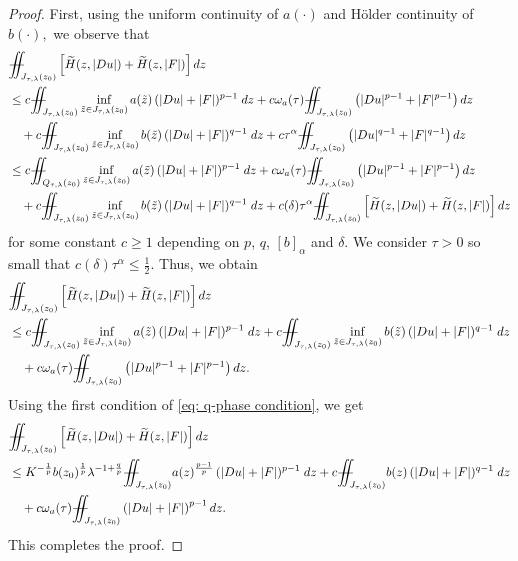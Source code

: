 \documentclass[11pt,oneside, english,reqno,twoside a4paper]{amsart}
\theoremstyle{definition}
\numberwithin{theorem}{section}
\numberwithin{equation}{section}
\newcommand{\iintss}{{\int\hspace{-0.28cm}\int}}
\newcommand{ \miints }{{\iintss\hspace{-0.56cm} -\hspace{-0.15cm}-}}
\newcommand{\miint}[1]{{\miints_{\hspace{-0.13cm}#1}}}
\begin{document}
\begin{proof}
First, using the uniform continuity of $a(\cdot)$ and H\"{o}lder continuity of $b(\cdot),$ we observe that
\begin{align*}
&\miint{J_{\tau,\lambda}(z_0)} \left[ \widetilde{H}(z,|Du|)+\widetilde{H}(z,|F|)\right] dz\\
&\leq c\miint{J_{\tau,\lambda}(z_0)} \inf_{\tilde{z}\in J_{\tau,\lambda}(z_0)}a(\tilde{z}) \, (|Du|+|F|)^{p-1} \; dz+c \omega_a(\tau) \miint{J_{\tau,\lambda}(z_0)} \left(|Du|^{p-1}+|F|^{p-1}\right) dz\\
&\quad +c\miint{J_{\tau,\lambda}(z_0)}\inf_{\tilde{z}\in J_{\tau,\lambda}(z_0)}b(\tilde{z}) \, (|Du|+|F|)^{q-1}\;dz+c\tau^\alpha \miint{J_{\tau,\lambda}(z_0)} \left(|Du|^{q-1}+|F|^{q-1}\right) dz\\
& \leq c\miint{Q_{\tau,\lambda}(z_0)} \inf_{\tilde{z}\in J_{\tau,\lambda}(z_0)}a(\tilde{z}) \, (|Du|+|F|)^{p-1} \; dz+c \omega_a(\tau) \miint{J_{\tau,\lambda}(z_0)} \left(|Du|^{p-1}+|F|^{p-1}\right) dz\\
&\quad +c\miint{J_{\tau,\lambda}(z_0)}\inf_{\tilde{z}\in J_{\tau,\lambda}(z_0)}b(\tilde{z}) \, (|Du|+|F|)^{q-1}\;dz+c(\delta) \tau^\alpha \miint{J_{\tau,\lambda}(z_0)} \left[\widetilde{H}(z,|Du|)+\widetilde{H}(z,|F|) \right] dz
\end{align*}
for some constant $c \geq 1$ depending on $p$, $q$, $[b]_\alpha$ and $\delta$.
We consider $\tau>0$ so small that $\displaystyle c (\delta) \tau^\alpha \leq \frac{1}{2}$. Thus, we obtain
\begin{align*}
&\miint{J_{\tau,\lambda}(z_0)} \left[\widetilde{H}(z,|Du|)+\widetilde{H}(z,|F|) \right]dz\\
& \leq c\miint{J_{\tau,\lambda}(z_0)} \inf_{\tilde{z}\in J_{\tau,\lambda}(z_0)}a(\tilde{z}) \, (|Du|+|F|)^{p-1} \; dz+c\miint{J_{\tau,\lambda}(z_0)}\inf_{\tilde{z}\in J_{\tau,\lambda}(z_0)}b(\tilde{z}) \, (|Du|+|F|)^{q-1}\;dz\\
&\quad +c\omega_a(\tau) \miint{J_{\tau,\lambda}(z_0)} \left(|Du|^{p-1}+|F|^{p-1} \right) dz.
\end{align*}
Using the first condition of \eqref{eq: q-phase condition}, we get
\begin{align*}
   &\miint{J_{\tau,\lambda}(z_0)} \left[\widetilde{H}(z,|Du|)+\widetilde{H}(z,|F|) \right]dz\\ 
   &\leq K^{-\frac{1}{p}}b(z_0)^{\frac{1}{p}}\lambda^{-1+\frac{q}{p}}\miint{J_{\tau,\lambda}(z_0)} a(z)^{\frac{p-1}{p}} \, (|Du|+|F|)^{p-1} \; dz+c\miint{J_{\tau,\lambda}(z_0)}b(z) \, (|Du|+|F|)^{q-1}\;dz\\
   &\quad +c\omega_a(\tau) \miint{J_{\tau,\lambda}(z_0)} \left(|Du|+|F|\right)^{p-1} dz.
\end{align*}
This completes the proof.
\end{proof}
\end{document}
